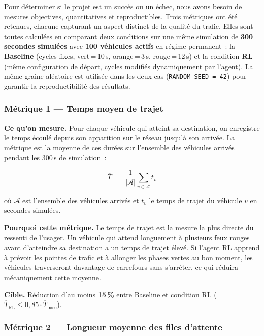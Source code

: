\documentclass[a4paper,10pt]{article}
\begin{document}
Pour d\'{e}terminer si le projet est un succ\`{e}s ou un \'{e}chec, nous avons besoin
de mesures objectives, quantitatives et reproductibles.
Trois m\'{e}triques ont \'{e}t\'{e} retenues, chacune capturant un aspect distinct
de la qualit\'{e} du trafic.
Elles sont toutes calcul\'{e}es en comparant deux conditions sur une m\^{e}me
simulation de \textbf{300 secondes simul\'{e}es} avec \textbf{100 v\'{e}hicules actifs}
en r\'{e}gime permanent~: la \textbf{Baseline} (cycles fixes, vert\,=\,10\,s,
orange\,=\,3\,s, rouge\,=\,12\,s) et la condition \textbf{RL}
(m\^{e}me configuration de d\'{e}part, cycles modifi\'{e}s dynamiquement par l'agent).
La m\^{e}me graine al\'{e}atoire est utilis\'{e}e dans les deux cas
(\texttt{RANDOM\_SEED\,=\,42}) pour garantir la reproductibilit\'{e} des r\'{e}sultats.

\subsubsection*{M\'{e}trique 1 --- Temps moyen de trajet}

\textbf{Ce qu'on mesure.}
Pour chaque v\'{e}hicule qui atteint sa destination, on enregistre le temps
\'{e}coul\'{e} depuis son apparition sur le r\'{e}seau jusqu'\`{a} son arriv\'{e}e.
La m\'{e}trique est la moyenne de ces dur\'{e}es sur l'ensemble des v\'{e}hicules
arriv\'{e}s pendant les 300\,s de simulation~:

\[
  \overline{T}
  \;=\;
  \frac{1}{|\mathcal{A}|} \sum_{v \in \mathcal{A}} t_v
\]

o\`{u} $\mathcal{A}$ est l'ensemble des v\'{e}hicules arriv\'{e}s et $t_v$
le temps de trajet du v\'{e}hicule $v$ en secondes simul\'{e}es.

\textbf{Pourquoi cette m\'{e}trique.}
Le temps de trajet est la mesure la plus directe du ressenti de l'usager.
Un v\'{e}hicule qui attend longuement \`{a} plusieurs feux rouges
avant d'atteindre sa destination a un temps de trajet \'{e}lev\'{e}.
Si l'agent RL apprend \`{a} pr\'{e}voir les pointes de trafic et \`{a}
allonger les phases vertes au bon moment, les v\'{e}hicules traverseront
davantage de carrefours sans s'arr\^{e}ter, ce qui r\'{e}duira m\'{e}caniquement
cette moyenne.

\textbf{Cible.} R\'{e}duction d'au moins \textbf{15\,\%}
entre Baseline et condition RL ($\overline{T}_{\text{RL}} \leq 0{,}85 \cdot \overline{T}_{\text{base}}$).

\subsubsection*{M\'{e}trique 2 --- Longueur moyenne des files d'attente}
\end{document}
